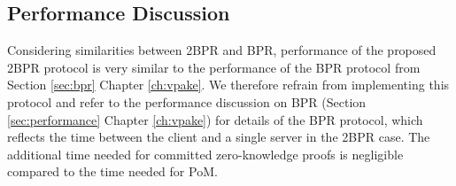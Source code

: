 \subsection{Performance Discussion}
Considering similarities between \ac{2BPR} and \ac{BPR}, performance of the proposed \ac{2BPR} protocol is very similar to the performance of the \ac{BPR} protocol from Section \ref{sec:bpr} Chapter \ref{ch:vpake}.
We therefore refrain from implementing this protocol and refer to the performance discussion on \ac{BPR} (Section \ref{sec:performance} Chapter \ref{ch:vpake}) for details of the \ac{BPR} protocol, which reflects the time between the client and a single server in the \ac{2BPR} case.
The additional time needed for committed zero-knowledge proofs is negligible compared to the time needed for \ac{PoM}.

%
%

